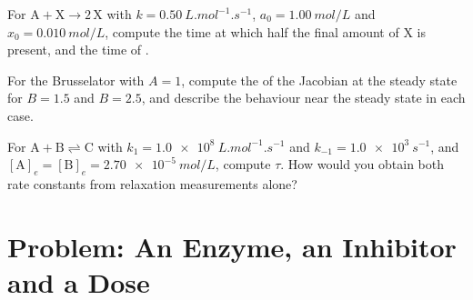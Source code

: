 \begin{exercise}[$\star\star\star$]\label{exo:b3:complex-kinetics:10}
For $\mathrm{A + X \to 2\,X}$ with $k = \qty{0.50}{L.mol^{-1}.s^{-1}}$, $a_0 = \qty{1.00}{mol/L}$ and $x_0 = \qty{0.010}{mol/L}$,
compute the time at which half the final amount of X is present, and the
time of .
\end{exercise}

\begin{exercise}[$\star\star\star$]\label{exo:b3:complex-kinetics:11}
For the Brusselator with $A = 1$, compute the  of the Jacobian at
the steady state for $B = 1.5$ and $B = 2.5$, and describe the behaviour near the
steady state in each case.
\end{exercise}

\begin{exercise}[$\star\star\star$]\label{exo:b3:complex-kinetics:12}
For $\mathrm{A + B \rightleftharpoons C}$ with $k_1 = \qty{1.0e8}{L.mol^{-1}.s^{-1}}$ and $k_{-1} = \qty{1.0e3}{s^{-1}}$, and
$[\mathrm A]_e = [\mathrm B]_e = \qty{2.70e-5}{mol/L}$, compute $\tau$. How would you obtain both rate constants
from relaxation measurements alone?
\end{exercise}

\section{Problem: An Enzyme, an Inhibitor and a Dose}

